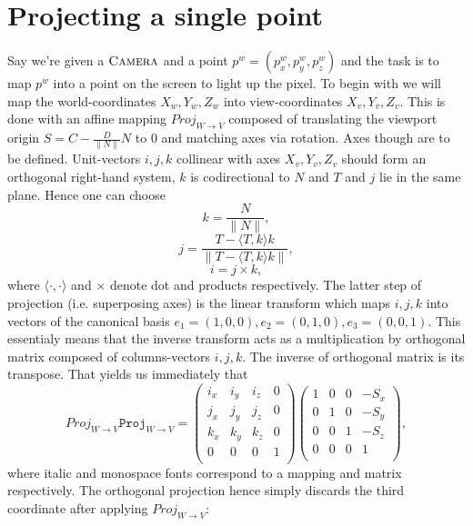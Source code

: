 \documentclass[a4paper]{article}
\begin{document}
\section{Projecting a single point}
Say we're given a \( \textsc{Camera} \) and a point \( p^w = (p_x^w,p_y^w,p_z^w) \)
and the task is to map \( p^w \) into a point on the screen to light up the pixel.
To begin with we will map the world-coordinates \(X_w,Y_w,Z_w\) into view-coordinates \( X_v,Y_v,Z_v \).
This is done with an affine mapping \( \mathit{Proj}_{W\to V} \) composed of
translating the viewport origin \( S = C - \frac{D}{\|N\|} N \) to \( 0 \)
and matching axes via rotation.
Axes though are to be defined.
Unit-vectors \( i,j,k \) collinear with axes \( X_v,Y_v,Z_v \)
should form an orthogonal right-hand system,
\( k \) is codirectional to \( N \)
and \( T \) and \( j \) lie in the same plane.
Hence one can choose
\[ k = \frac{N}{\|N\|}, \]
\[ j = \frac{T - \langle T,k \rangle k}{\|T - \langle T,k \rangle k\|}, \]
\[ i = j\times k, \]
where \(\langle\cdot,\cdot\rangle\) and \( \times \) denote dot and products respectively.
The latter step of projection (i.e. superposing axes)
is the linear transform which maps \( i,j,k \)
into vectors of the canonical basis \( e_1=(1,0,0), e_2=(0,1,0), e_3=(0,0,1) \).
This essentialy means that the inverse transform
acts as a multiplication by orthogonal matrix
composed of columns-vectors \( i, j, k \).
The inverse of orthogonal matrix is its transpose.
That yields us immediately that
\[ \mathit{Proj}_{W\to V} \mathtt{Proj}_{W\to V} =
\begin{pmatrix}
    i_x & i_y & i_z & 0 \\
    j_x & j_y & j_z & 0 \\
    k_x & k_y & k_z & 0 \\
    0   & 0   & 0   & 1 \\
\end{pmatrix}
\begin{pmatrix}
    1 & 0 & 0 & -S_x \\
    0 & 1 & 0 & -S_y \\
    0 & 0 & 1 & -S_z \\
    0 & 0 & 0 & 1 \\
\end{pmatrix}, \]
where italic and monospace fonts correspond to a mapping and matrix respectively.
The orthogonal projection hence
simply discards the third coordinate after applying \( \mathit{Proj}_{W\to V} \):
\end{document}
